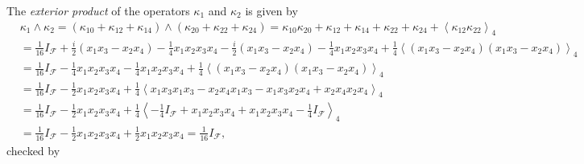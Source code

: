 \documentclass[aps,preprint]{revtex4}%
\begin{document}
The\emph{ exterior product} of the operators $\kappa_{1}$ and $\kappa_{2}$ is
given by
\begin{align}
&  \kappa_{1}\wedge\kappa_{2}=\left(  \kappa_{10}+\kappa_{12}+\kappa
_{14}\right)  \wedge\left(  \kappa_{20}+\kappa_{22}+\kappa_{24}\right)
=\kappa_{10}\kappa_{20}+\kappa_{12}+\kappa_{14}+\kappa_{22}+\kappa
_{24}+\left\langle \kappa_{12}\kappa_{22}\right\rangle _{4}\\
&  =\frac{1}{16}I_{\mathcal{F}}+\frac{i}{2}\left(  x_{1}x_{3}-x_{2}%
x_{4}\right)  -\frac{1}{4}x_{1}x_{2}x_{3}x_{4}-\frac{i}{2}\left(  x_{1}%
x_{3}-x_{2}x_{4}\right)  -\frac{1}{4}x_{1}x_{2}x_{3}x_{4}+\frac{1}%
{4}\left\langle \left(  x_{1}x_{3}-x_{2}x_{4}\right)  \left(  x_{1}x_{3}%
-x_{2}x_{4}\right)  \right\rangle _{4}\\
&  =\frac{1}{16}I_{\mathcal{F}}-\frac{1}{4}x_{1}x_{2}x_{3}x_{4}-\frac{1}%
{4}x_{1}x_{2}x_{3}x_{4}+\frac{1}{4}\left\langle \left(  x_{1}x_{3}-x_{2}%
x_{4}\right)  \left(  x_{1}x_{3}-x_{2}x_{4}\right)  \right\rangle _{4}\\
&  =\frac{1}{16}I_{\mathcal{F}}-\frac{1}{2}x_{1}x_{2}x_{3}x_{4}+\frac{1}%
{4}\left\langle x_{1}x_{3}x_{1}x_{3}-x_{2}x_{4}x_{1}x_{3}-x_{1}x_{3}x_{2}%
x_{4}+x_{2}x_{4}x_{2}x_{4}\right\rangle _{4}\\
&  =\frac{1}{16}I_{\mathcal{F}}-\frac{1}{2}x_{1}x_{2}x_{3}x_{4}+\frac{1}%
{4}\left\langle -\frac{1}{4}I_{\mathcal{F}}+x_{1}x_{2}x_{3}x_{4}+x_{1}%
x_{2}x_{3}x_{4}-\frac{1}{4}I_{\mathcal{F}}\right\rangle _{4}\\
&  =\frac{1}{16}I_{\mathcal{F}}-\frac{1}{2}x_{1}x_{2}x_{3}x_{4}+\frac{1}%
{2}x_{1}x_{2}x_{3}x_{4}=\frac{1}{16}I_{\mathcal{F}},
\end{align}
checked by%
\end{document}
